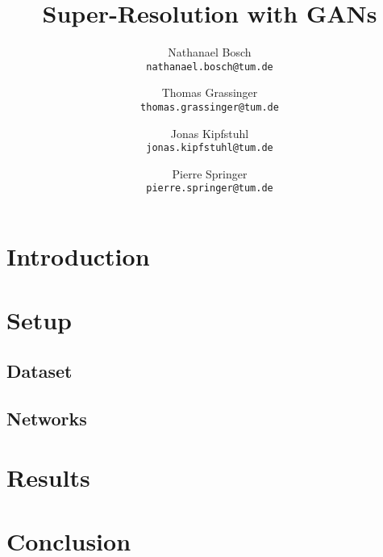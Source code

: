 \documentclass[10pt,twocolumn,letterpaper]{article}
\begin{document}
\title{Super-Resolution with GANs}

\author{Nathanael Bosch\\
{\tt\small nathanael.bosch@tum.de}
\and
Thomas Grassinger\\
{\tt\small thomas.grassinger@tum.de}
\and
Jonas Kipfstuhl\\
{\tt\small jonas.kipfstuhl@tum.de}
\and
Pierre Springer\\
{\tt\small pierre.springer@tum.de}
}


\maketitle

\section{Introduction}
\label{sec:intro}


\section{Setup}
\label{sec:setup}


\subsection{Dataset}
\label{sec:data}


\subsection{Networks}
\label{sec:nets}


\section{Results}
\label{sec:results}


\section{Conclusion}
\label{sec:conclusion}
\end{document}
